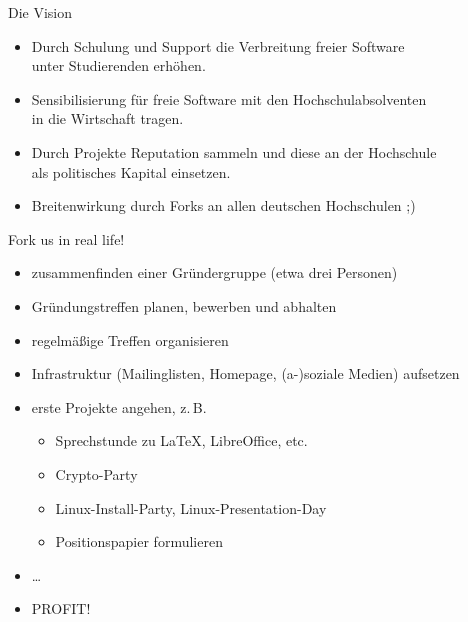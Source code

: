 \documentclass{beamer}
\begin{document}
\begin{frame}{Die Vision}
  \begin{itemize}
  \item<1-> Durch Schulung und Support die Verbreitung freier Software \\
    unter Studierenden erhöhen.
  \item<2-> Sensibilisierung für freie Software mit den Hochschulabsolventen  \\
    in die Wirtschaft tragen.
  \item<3-> Durch Projekte Reputation sammeln und diese an der Hochschule \\
    als politisches Kapital einsetzen.
  \item<4-> Breitenwirkung durch Forks an allen deutschen Hochschulen ;)
  \end{itemize}
\end{frame}

\begin{frame}{Fork us in real life!}
  \begin{itemize}
  \item<1-> zusammenfinden einer Gründergruppe (etwa drei Personen)
  \item<2-> Gründungstreffen planen, bewerben und abhalten
  \item<3-> regelmäßige Treffen organisieren
  \item<4-> Infrastruktur (Mailinglisten, Homepage, (a-)soziale Medien) aufsetzen
  \item<5-> erste Projekte angehen, z.\,B.
    \begin{itemize}
    \item Sprechstunde zu LaTeX, LibreOffice, etc.
    \item Crypto-Party
    \item Linux-Install-Party, Linux-Presentation-Day
    \item Positionspapier formulieren
    \end{itemize}
  \item<6-> \dots
  \item<7-> PROFIT!
  \end{itemize}
\end{frame}
\end{document}

